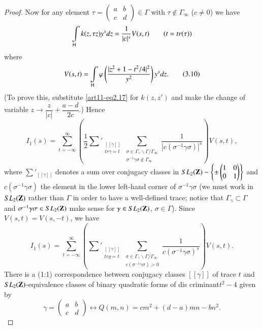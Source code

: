 \begin{proof}
Now for any element $\tau =\left(\begin{matrix}
a & b\\
c & d
\end{matrix} \right) \in \Gamma$ with $\tau \not\in \Gamma_\infty$ (\ie $c \neq 0$) we have 
$$
\int\limits_{\mathsf{H}} k (z, \tau z)y^sdz = \frac{1}{|c|^s} V(s,t) \qquad (t = tr (\tau))
$$
where 
\begin{equation*}
V(s,t) = \int\limits_{\mathsf{H}} \varphi \left(\frac{|z^2+ 1 - t^2/4|^2}{y^2} \right) y^s dz. 
\tag{3.10}\label{art11-eq3.10}
\end{equation*}
(To prove this, substitute \eqref{art11-eq2.17} for $k(z,z')$ and make the change of variable $z \to \dfrac{z}{|c|} + \dfrac{a-d}{2c}$.) Hence 
$$
I_1 (s) = \sum\limits^\infty_{t = - \infty} \left(\frac{1}{2} \sum\limits'_{\substack{[[\gamma]]\\ tr \gamma = t}} \sum\limits_{\substack{\sigma \in \Gamma_\gamma \backslash \Gamma / \Gamma_\infty\\ \sigma^{-1} \gamma \sigma \not\in \Gamma_\infty}} \frac{1}{|c(\sigma^{-1} \gamma \sigma)|^s}
\right) V(s,t),
$$
where $\sum\limits'_{[[\gamma]]}$ denotes a sum over conjugacy classes in
$SL_2 (\mathbf{Z}) - \left\{\pm 
\left(
\begin{matrix}
1&0\\
0&1
\end{matrix}
\right) \right\}$ and $c(\sigma^{-1} \gamma \sigma)$ the element in the lower left-hand corner of $\sigma^{-1} \gamma \sigma$ (we must work in $SL_2 (\mathbf{Z})$ rather than $\Gamma$ in order to have a well-defined trace; notice that $\Gamma_\gamma \subset \Gamma$ and $\sigma^{-1} \gamma \sigma \in SL_2 (\mathbf{Z})$ make sense for $\gamma \in SL_2 (\mathbf{Z})$, $\sigma \in \Gamma$). Since $V(s,t) = V (s, -t)$, we have 
$$
I_1 (s) =\sum\limits^\infty_{t = -\infty} \left(\sum\limits'_{\substack{[[\gamma]]\\ tr y = t}}  \sum\limits_{\substack{\sigma \in \Gamma_\gamma \backslash \Gamma / \Gamma_\infty\\ c(\sigma^{-1} \gamma \sigma) >0}} \frac{1}{c(\sigma^{-1} \gamma \sigma)^s} \right) V(s,t). 
$$
There is a (1:1) correspondence between conjugacy classes $[[\gamma]]$ of trace $t$ and $SL_2 (\mathbf{Z})$-equivalence classes of binary quadratic forms of dis criminant\pageoriginale $t^2 - 4$ given by 
$$
\gamma = 
\left(
\begin{matrix}
a & b \\c &d
\end{matrix}
 \right) \leftrightarrow Q (m,n) = cm^2 + (d-a) mn - bn^2. 
$$
\end{proof}
